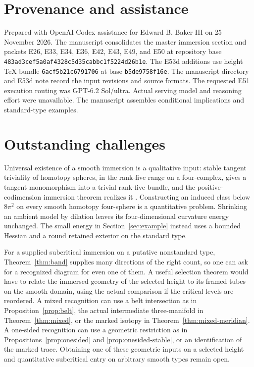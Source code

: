 \documentclass[11pt,letterpaper]{article}
\numberwithin{equation}{section}
\begin{document}
\section*{Provenance and assistance}
Prepared with OpenAI Codex assistance for Edward B. Baker III on
25 November 2026. The manuscript consolidates the master
immersion section and packets E26, E33, E34, E36, E42, E43, E49,
and E50 at repository base \texttt{483ad3cef5a0af4328c5d35cabbc1f5224d26b1e}.
The E53d additions use height TeX bundle \texttt{6acf5b21c6791706}
at base \texttt{b5de9758f16e}. The manuscript directory and E53d note
record the input revisions and source formats. The requested E51
execution routing was GPT-6.2 Sol/ultra. Actual serving model and
reasoning effort were unavailable. The manuscript assembles
conditional implications and standard-type examples.

\section{Outstanding challenges}\label{sec:open}

Universal existence of a smooth immersion is a qualitative input:
stable tangent triviality of homotopy spheres, in the rank-five
range on a four-complex, gives a tangent monomorphism into a
trivial rank-five bundle, and the positive-codimension immersion
theorem realizes it \cite[Theorem 3.1]{KervaireMilnor1963Groups}
\cite[\S6]{Hirsch1959Immersions}. Constructing an induced class
below \(8\pi^2\) on every smooth homotopy four-sphere is a
quantitative problem. Shrinking an ambient model by dilation leaves
its four-dimensional curvature energy unchanged. The small energy
in Section~\ref{sec:example} instead uses a bounded Hessian and
a round retained exterior on the standard type.

For a supplied subcritical immersion on a putative nonstandard
type, Theorem~\ref{thm:band} supplies many directions of the right
count, so one can ask for a recognized diagram for even one of
them. A useful selection theorem would have to relate the immersed
geometry of the selected height to its framed tubes on the smooth
domain, using the actual comparison if the critical levels are
reordered. A mixed recognition can use a belt intersection as in
Proposition~\ref{prop:belt}, the actual intermediate three-manifold
in Theorem~\ref{thm:mixed}, or the marked isotopy in
Theorem~\ref{thm:mixed-meridian}. A one-sided recognition can use a
geometric restriction as in Propositions~\ref{prop:onesided} and
\ref{prop:onesided-stable}, or an identification of the marked trace.
Obtaining one of these geometric inputs on a selected height and
quantitative subcritical entry on arbitrary smooth types remain open.

\begingroup
\raggedright


\endgroup
\end{document}

